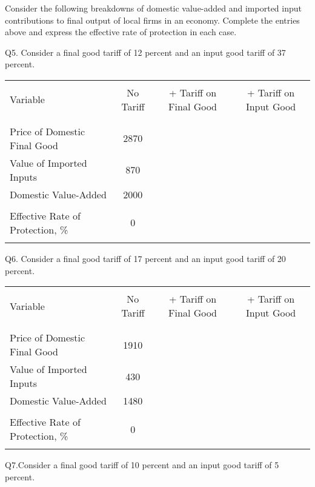 \documentclass[12pt]{article}
\begin{document}
\newpage


\noindent Consider the following breakdowns of domestic value-added and imported input contributions to final output of local firms in an economy.
Complete the entries above and express the effective rate of protection in each case.

\noindent Q5. Consider a final good tariff of 12 percent and an input good tariff of 37 percent.

\begin{table}[!h]
	\centering
	\begin{tabular}[t]{l c c c}
		\hline
		&&&\\
		Variable & No Tariff & + Tariff on Final Good & + Tariff on Input Good \\
		&&&\\
		\hline
		&&&\\
		Price of Domestic Final Good & 2870 & & \\
		Value of Imported Inputs & 870 & & \\
		Domestic Value-Added &	2000	&&\\
		&&&\\
		Effective Rate of Protection, \% &	0	&& \\
		&&&\\
		\hline
	\end{tabular}
\end{table}

\noindent Q6. Consider a final good tariff of 17 percent and an input good tariff of 20 percent.

\begin{table}[!h]
	\centering
	\begin{tabular}[t]{l c c c}
		\hline
		&&&\\
		Variable & No Tariff & + Tariff on Final Good & + Tariff on Input Good \\
		&&&\\
		\hline
		&&&\\
		Price of Domestic Final Good & 1910 & & \\
		Value of Imported Inputs & 430 & & \\
		Domestic Value-Added &	1480	&&\\
		&&&\\
		Effective Rate of Protection, \% &	0	&& \\
		&&&\\
		\hline
	\end{tabular}
\end{table}

\noindent Q7.Consider a final good tariff of 10 percent and an input good tariff of 5 percent.
 
\end{document}
